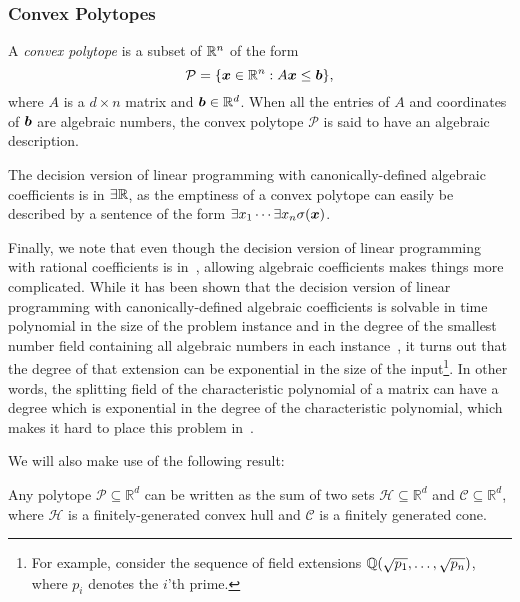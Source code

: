 \subsubsection{Convex Polytopes}

A \emph{convex polytope} is a subset of $\mathbb{R}^{n}$ of the form
\begin{equation*}
\mathcal{P} = \lbrace \boldsymbol{x} \in \mathbb{R}^{n} : A \boldsymbol{x} \leq \boldsymbol{b} \rbrace ,
\end{equation*}
where $A$ is a $d \times n$ matrix and $\boldsymbol{b} \in \mathbb{R}^{d}$. When all the entries of $A$ and coordinates of $\boldsymbol{b}$ are algebraic numbers, the convex polytope $\mathcal{P}$ is said to have an algebraic description.

The decision version of linear programming with canonically-defined algebraic coefficients is in $\exists\mathbb{R}$, as the emptiness of a convex polytope can easily be described by a sentence of the form $\exists x_1 \cdots \exists x_n \sigma(\boldsymbol{x})$.

Finally, we note that even though the decision version of linear
programming with rational coefficients is in~\PTIME{}, allowing
algebraic coefficients makes things more complicated. While it has
been shown that the decision version of linear programming
with canonically-defined algebraic coefficients is solvable in time polynomial
in the size of the problem instance and in the degree of the smallest
number field containing all algebraic numbers in each instance~\cite{AdlerB94}, it
turns out that the degree of that extension can
be exponential in the size of the input\footnote{For example, consider the sequence of field extensions $\mathbb{Q}(\sqrt{p_{1}}, \ldots, \sqrt{p_{n}})$, where $p_{i}$ denotes the $i$'th prime.}. In other words, the splitting
field of the characteristic polynomial of a matrix can have a degree
which is exponential in the degree of the characteristic polynomial, which makes it hard to place this problem in~\PTIME{}.

We will also make use of the following result:
\begin{theorem}
  Any polytope $\mathcal{P} \subseteq \mathbb{R}^{d}$ can be written as the sum of two sets $\mathcal{H} \subseteq \mathbb{R}^{d}$ and $\mathcal{C} \subseteq \mathbb{R}^{d}$, where $\mathcal{H}$ is a finitely-generated convex hull and $\mathcal{C}$ is a finitely generated cone.
\end{theorem}
